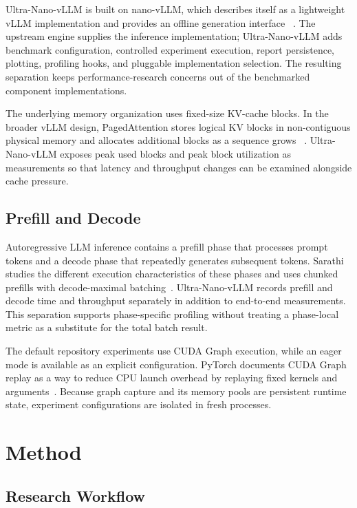 \documentclass[conference]{IEEEtran}
\begin{document}
Ultra-Nano-vLLM is built on nano-vLLM, which describes itself as a lightweight
vLLM implementation and provides an offline generation interface
~\cite{nanovllm}. The upstream engine supplies the inference implementation;
Ultra-Nano-vLLM adds benchmark configuration, controlled experiment execution,
report persistence, plotting, profiling hooks, and pluggable implementation
selection. The resulting separation keeps performance-research concerns out of
the benchmarked component implementations.

The underlying memory organization uses fixed-size KV-cache blocks. In the
broader vLLM design, PagedAttention stores logical KV blocks in non-contiguous
physical memory and allocates additional blocks as a sequence grows
~\cite{kwon2023vllm}. Ultra-Nano-vLLM exposes peak used blocks and peak block
utilization as measurements so that latency and throughput changes can be
examined alongside cache pressure.

\subsection{Prefill and Decode}

Autoregressive LLM inference contains a prefill phase that processes prompt
tokens and a decode phase that repeatedly generates subsequent tokens.
Sarathi studies the different execution characteristics of these phases and
uses chunked prefills with decode-maximal batching~\cite{agrawal2023sarathi}.
Ultra-Nano-vLLM records prefill and decode time and throughput separately in
addition to end-to-end measurements. This separation supports phase-specific
profiling without treating a phase-local metric as a substitute for the total
batch result.

The default repository experiments use CUDA Graph execution, while an eager
mode is available as an explicit configuration. PyTorch documents CUDA Graph
replay as a way to reduce CPU launch overhead by replaying fixed kernels and
arguments~\cite{pytorchcudagraphs}. Because graph capture and its memory pools
are persistent runtime state, experiment configurations are isolated in fresh
processes.

\section{Method}

\subsection{Research Workflow}
\end{document}
